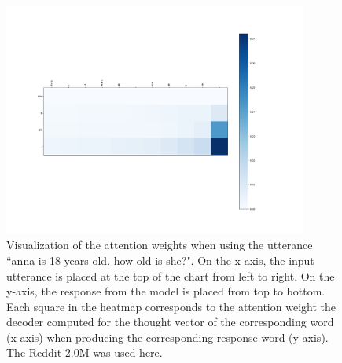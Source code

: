 \begin{figure}[H]
	\centering
	\includegraphics[width=10cm]{img/attention/attention_visualization3_reddit_2m.png}
	\caption{Visualization of the attention weights when using the utterance ``anna is 18 years old. how old is she?". On the x-axis, the input utterance is placed at the top of the chart from left to right. On the y-axis, the response from the model is placed from top to bottom. Each square in the heatmap corresponds to the attention weight the decoder computed for the thought vector of the corresponding word (x-axis) when producing the corresponding response word (y-axis). The Reddit 2.0M was used here.}
	\label{results:attention:example4:reddit}
\end{figure}